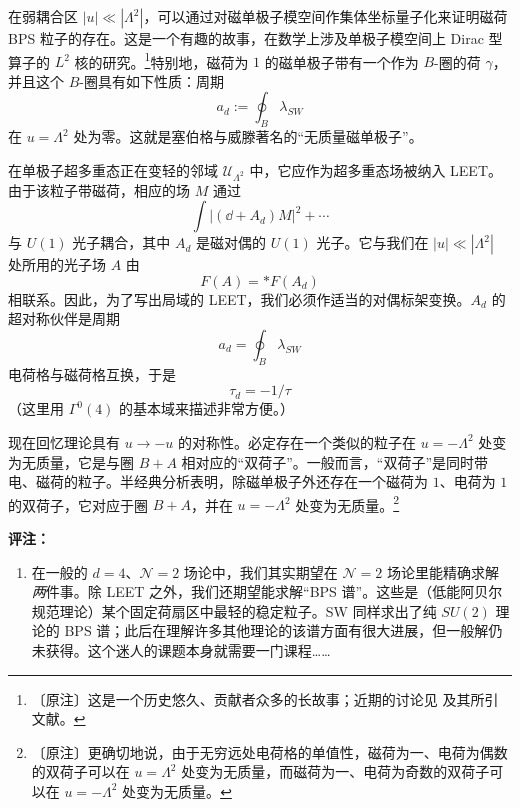 在弱耦合区 $|u|\ll|\Lambda^{2}|$，可以通过对磁单极子模空间作集体坐标量子化来证明磁荷 BPS 粒子的存在。这是一个有趣的故事，在数学上涉及单极子模空间上 Dirac 型算子的 $L^{2}$ 核的研究。\footnote{〔原注〕这是一个历史悠久、贡献者众多的长故事；近期的讨论见 \cite{ref41} 及其所引文献。}特别地，磁荷为 $1$ 的磁单极子带有一个作为 $B$-圈的荷 $\gamma$，并且这个 $B$-圈具有如下性质：周期
\begin{equation}
a_{d}:=\oint_{B}\lambda_{SW}
\tag{5.49}
\end{equation}
在 $u=\Lambda^{2}$ 处为零。这就是塞伯格与威滕著名的“无质量磁单极子”。

在单极子超多重态正在变轻的邻域 $\mathcal{U}_{\Lambda^{2}}$ 中，它应作为超多重态场被纳入 LEET。由于该粒子带磁荷，相应的场 $M$ 通过
\begin{equation}
\int\left|(\dd+A_{d})M\right|^{2}+\cdots
\tag{5.50}
\end{equation}
与 $U(1)$ 光子耦合，其中 $A_{d}$ 是磁对偶的 $U(1)$ 光子。它与我们在 $|u|\ll|\Lambda^{2}|$ 处所用的光子场 $A$ 由
\begin{equation}
F(A)=\ast F(A_{d})
\tag{5.51}
\end{equation}
相联系。因此，为了写出局域的 LEET，我们必须作适当的对偶标架变换。$A_{d}$ 的超对称伙伴是周期
\begin{equation}
a_{d}=\oint_{B}\lambda_{SW}
\tag{5.52}
\end{equation}
电荷格与磁荷格互换，于是
\begin{equation}
\tau_{d}=-1/\tau
\tag{5.53}
\end{equation}
（这里用 $\Gamma^{0}(4)$ 的基本域来描述非常方便。）

现在回忆理论具有 $u\to-u$ 的对称性。必定存在一个类似的粒子在 $u=-\Lambda^{2}$ 处变为无质量，它是与圈 $B+A$ 相对应的“双荷子”。一般而言，“双荷子”是同时带电、磁荷的粒子。半经典分析表明，除磁单极子外还存在一个磁荷为 $1$、电荷为 $1$ 的双荷子，它对应于圈 $B+A$，并在 $u=-\Lambda^{2}$ 处变为无质量。\footnote{〔原注〕更确切地说，由于无穷远处电荷格的单值性，磁荷为一、电荷为偶数的双荷子可以在 $u=\Lambda^{2}$ 处变为无质量，而磁荷为一、电荷为奇数的双荷子可以在 $u=-\Lambda^{2}$ 处变为无质量。}

\medskip
\noindent\textbf{评注：}
\begin{enumerate}[label=\arabic*., leftmargin=2.1em]
\item 在一般的 $d=4$、$\mathcal{N}=2$ 场论中，我们其实期望在 $\mathcal{N}=2$ 场论里能精确求解\emph{两}件事。除 LEET 之外，我们还期望能求解“BPS 谱”。这些是（低能阿贝尔规范理论）某个固定荷扇区中最轻的稳定粒子。SW 同样求出了纯 $SU(2)$ 理论的 BPS 谱；此后在理解许多其他理论的该谱方面有很大进展，但一般解仍未获得。这个迷人的课题本身就需要一门课程……
\end{enumerate}

